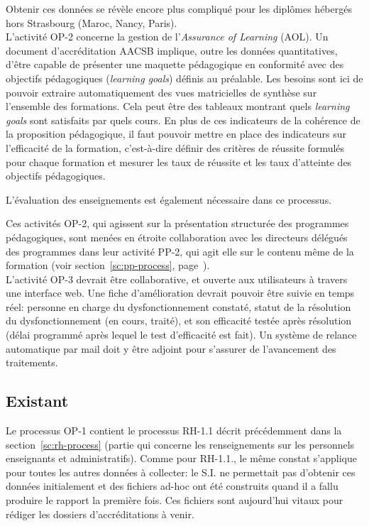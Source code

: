\documentclass{book}
\begin{document}
Obtenir ces données  se révèle encore plus compliqué pour  les diplômes hébergés
hors Strasbourg (Maroc, Nancy, Paris).\\


L'activité OP-2 concerne la gestion de l'\emph{Assurance of Learning} (AOL).  Un
document d'accréditation AACSB implique, outre les données quantitatives, d'être
capable de présenter  une maquette pédagogique en conformité  avec des objectifs
pédagogiques (\emph{learning goals}) définis au préalable.  Les besoins sont ici
de  pouvoir  extraire automatiquement  des  vues  matricielles de  synthèse  sur
l'ensemble  des  formations.   Cela  peut  être  des   tableaux  montrant  quels
\emph{learning  goals}  sont  satisfaits  par  quels  cours.   En  plus  de  ces
indicateurs  de la  cohérence de  la  proposition pédagogique,  il faut  pouvoir
mettre en place  des indicateurs sur l'efficacité de  la formation, c'est-à-dire
définir des critères  de réussite formulés pour chaque formation  et mesurer les
taux de réussite et les taux d'atteinte des objectifs pédagogiques.

L'évaluation des enseignements est également nécessaire dans ce processus.

Ces activités OP-2,  qui agissent sur la présentation  structurée des programmes
pédagogiques, sont menées en étroite  collaboration avec les directeurs délégués
des programmes dans leur activité PP-2, qui  agit elle sur le contenu même de la
formation (voir section~\ref{sc:pp-process}, page~\pageref{sc:pp-process}).  \\

L'activité OP-3 devrait être collaborative, et ouverte aux utilisateurs à 
travers une interface web. Une fiche d'amélioration devrait pouvoir
être suivie en temps réel: personne en charge du dysfonctionnement constaté, 
statut de la résolution du dysfonctionnement (en cours, traité), et son 
efficacité testée après résolution (délai programmé après 
lequel le test d'efficacité est fait). Un système de relance automatique
par mail doit y être adjoint pour s'assurer de l'avancement des traitements.



\subsection{Existant}

Le  processus OP-1  contient le  processus  RH-1.1 décrit  précédemment dans  la
section~\ref{sc:rh-process}  (partie qui  concerne  les  renseignements sur  les
personnels enseignants et  administratifs). Comme pour RH-1.1.,  le même constat
s'applique pour toutes les autres données à collecter: le S.I. ne permettait pas
d'obtenir ces  données initialement  et des fichiers  ad-hoc ont  été construits
quand  il a  fallu  produire le  rapport  la première  fois.  Ces fichiers  sont
aujourd'hui vitaux pour rédiger les dossiers d'accréditations à venir.\\
\end{document}
